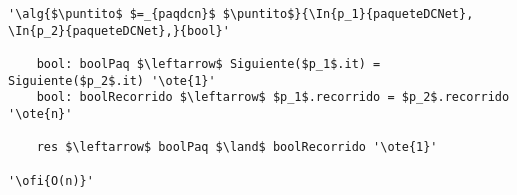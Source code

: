 \begin{lstlisting}[mathescape]
'\alg{$\puntito$ $=_{paqdcn}$ $\puntito$}{\In{p_1}{paqueteDCNet}, \In{p_2}{paqueteDCNet},}{bool}'

	bool: boolPaq $\leftarrow$ Siguiente($p_1$.it) = Siguiente($p_2$.it) '\ote{1}'
	bool: boolRecorrido $\leftarrow$ $p_1$.recorrido = $p_2$.recorrido '\ote{n}'

	res $\leftarrow$ boolPaq $\land$ boolRecorrido '\ote{1}'

'\ofi{O(n)}'
\end{lstlisting}
